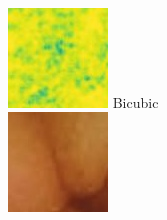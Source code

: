 \documentclass[conference]{IEEEtran}
\begin{document}
\begin{figure}[!t]
         \\
        \vfill
        \includegraphics[width=\linewidth]{Figures/983/983_Bicubic__ssim.jpg}
        Bicubic \\
    \endminipage\hfill
        \centering
        \includegraphics[width=\linewidth]{Figures/983/983_SRGAN.jpg}

\end{figure}
\end{document}
